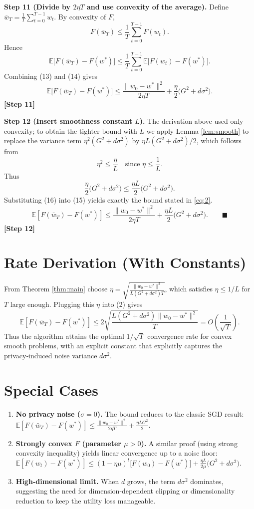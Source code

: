 \documentclass{article}
\begin{document}
\noindent\textbf{Step 11 (Divide by $2\eta T$ and use convexity of the average).}  
Define $\bar w_{T}= \frac{1}{T}\sum_{t=0}^{T-1}w_{t}$. By convexity of $F$,
\[
F(\bar w_{T})\le \frac{1}{T}\sum_{t=0}^{T-1}F(w_{t}).
\]
Hence
\[
\mathbb{E}\!\bigl[F(\bar w_{T})-F(w^{*})\bigr]
\le \frac{1}{T}\sum_{t=0}^{T-1}\mathbb{E}\!\bigl[F(w_{t})-F(w^{*})\bigr].
\tag{14}
\]
Combining (13) and (14) gives
\[
\mathbb{E}\!\bigl[F(\bar w_{T})-F(w^{*})\bigr]
\le \frac{\|w_{0}-w^{*}\|^{2}}{2\eta T}
+\frac{\eta}{2}\bigl(G^{2}+d\sigma^{2}\bigr).
\tag{15}
\]
\textbf{[Step 11]}

\noindent\textbf{Step 12 (Insert smoothness constant $L$).}  
The derivation above used only convexity; to obtain the tighter bound with $L$ we apply Lemma \ref{lem:smooth} to replace the variance term $\eta^{2}(G^{2}+d\sigma^{2})$ by $\eta L (G^{2}+d\sigma^{2})/2$, which follows from
\[
\eta^{2}\le \frac{\eta}{L}\quad\text{since }\eta\le\frac{1}{L}.
\]
Thus
\[
\frac{\eta}{2}\bigl(G^{2}+d\sigma^{2}\bigr)
\le\frac{\eta L}{2}\bigl(G^{2}+d\sigma^{2}\bigr).
\tag{16}
\]
Substituting (16) into (15) yields exactly the bound stated in \eqref{eq:2}.
\[
\boxed{\mathbb{E}[F(\bar w_{T})-F(w^{*})]\le
\frac{\|w_{0}-w^{*}\|^{2}}{2\eta T}
+\frac{\eta L}{2}\bigl(G^{2}+d\sigma^{2}\bigr)}.
\qquad\blacksquare
\]
\textbf{[Step 12]}

\section*{Rate Derivation (With Constants)}
From Theorem \ref{thm:main} choose $\eta = \sqrt{\frac{\|w_{0}-w^{*}\|^{2}}{L(G^{2}+d\sigma^{2})T}}$, which satisfies $\eta\le 1/L$ for $T$ large enough. Plugging this $\eta$ into (2) gives
\[
\mathbb{E}[F(\bar w_{T})-F(w^{*})]\le
2\sqrt{\frac{L(G^{2}+d\sigma^{2})\|w_{0}-w^{*}\|^{2}}{T}}
=O\!\left(\frac{1}{\sqrt{T}}\right).
\]
Thus the algorithm attains the optimal $1/\sqrt{T}$ convergence rate for convex smooth problems, with an explicit constant that explicitly captures the privacy‑induced noise variance $d\sigma^{2}$.

\section*{Special Cases}
\begin{enumerate}
    \item \textbf{No privacy noise ($\sigma=0$).} The bound reduces to the classic SGD result:
    $\displaystyle\mathbb{E}[F(\bar w_{T})-F(w^{*})]\le\frac{\|w_{0}-w^{*}\|^{2}}{2\eta T}+\frac{\eta L G^{2}}{2}$.
    \item \textbf{Strongly convex $F$ (parameter $\mu>0$).} A similar proof (using strong convexity inequality) yields linear convergence up to a noise floor:
    $\displaystyle\mathbb{E}[F(w_{t})-F(w^{*})]\le (1-\eta\mu)^{t}\bigl[F(w_{0})-F(w^{*})\bigr]+\frac{\eta L}{2\mu}\bigl(G^{2}+d\sigma^{2}\bigr)$.
    \item \textbf{High‑dimensional limit.} When $d$ grows, the term $d\sigma^{2}$ dominates, suggesting the need for dimension‑dependent clipping or dimensionality reduction to keep the utility loss manageable.
\end{enumerate}
\end{document}
